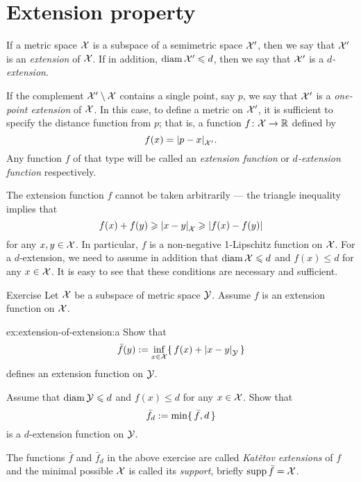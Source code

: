 \section{Extension property}
\label{sec:Extension property}

If a metric space $\mathcal{X}$ is a subspace of a semimetric space $\mathcal{X}'$, then we say that $\mathcal{X}'$ is an \emph{extension} of $\mathcal{X}$.
If in addition, $\operatorname{\rm diam}\nolimits\mathcal{X}'\leqslant d$, then we say that $\mathcal{X}'$ is a {}\emph{$d$-extension}.

If the complement $\mathcal{X}'\setminus \mathcal{X}$ contains a single point, say $p$, we say that $\mathcal{X}'$ is a \emph{one-point extension} of $\mathcal{X}$.
In this case, to define a metric on $\mathcal{X}'$, it is sufficient to specify the distance function from $p$; that is, a function $f\colon\mathcal{X}\to\mathbb{R}$ defined by 
\[f(x)=\dist{p}{x}{\spc{X}'}.\]
Any function $f$ of that type will be called an \emph{extension function}\label{page:extension function} or {}\emph{$d$-extension function} respectively.

The extension function $f$ cannot be taken arbitrarily --- the triangle inequality implies that 
\[f(x)+f(y)\ge \dist{x}{y}{\spc{X}}\ge |f(x)-f(y)|\]
for any $x,y\in \mathcal{X}$.
In particular, $f$ is a non-negative 1-Lipschitz function on $\mathcal{X}$.
For a $d$-extension, we need to assume in addition that $\diam\spc{X}\z\le d$ and $f(x)\le d$ for any $x\in \mathcal{X}$.
It is easy to see that these conditions are necessary and sufficient.

\begin{thm}{Exercise}\label{ex:extension-of-extension}
Let $\mathcal{X}$ be a subspace of metric space $\mathcal{Y}$.
Assume $f$ is an extension function on $\mathcal{X}$.

\begin{subthm}{ex:extension-of-extension:a}
Show that 
\[\bar f(y)
\df
\inf_{x\in \spc{X}} \{\,f(x)+\dist{x}{y}{\spc{Y}}\,\}\]
defines an extension function on $\mathcal{Y}$.
\end{subthm}

\begin{subthm}{}
Assume that $\operatorname{\rm diam}\nolimits \mathcal{Y}\leqslant d$ and $f(x)\le d$ for any $x\in  \mathcal{X}$.
Show that 
\[\bar f_d
\mathrel{:=}
\min \{\, \bar f,d\,\}\]
is a $d$-extension function on $\mathcal{Y}$.
\end{subthm}

\end{thm}

The functions $\bar f$ and $\bar f_d$ in the above exercise are called \emph{Katětov extensions} of $f$ and the minimal possible $\mathcal{X}$ is called its \emph{support}, briefly \index{$\supp$}$\operatorname{\rm supp}\nolimits \bar f=\mathcal{X}$.

